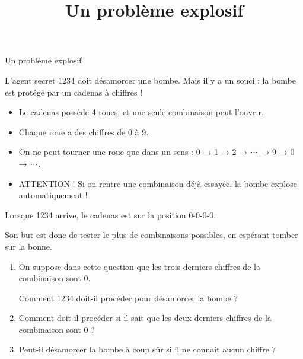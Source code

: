 \documentclass[a4paper,11pt]{article}
\title{Un problème explosif}
\date{}
\author{}
\begin{document}
\begin{center}
	\LARGE

	Un problème explosif
\end{center}


\vspace{1em}

L'agent secret 1234 doit désamorcer une bombe. Mais il y a un souci : la bombe est protégé par un cadenas à chiffres !

\begin{itemize}
	\item Le cadenas possède 4 roues, et une seule combinaison peut l'ouvrir.
	\item Chaque roue a des chiffres de 0 à 9.
	\item On ne peut tourner une roue que dans un sens : 0 → 1 → 2 → ⋯ → 9 → 0 → ⋯.
	\item ATTENTION ! Si on rentre une combinaison déjà essayée, la bombe explose automatiquement !
\end{itemize}

Lorsque 1234 arrive, le cadenas est sur la position 0-0-0-0.

Son but est donc de tester le plus de combinaisons possibles, en espérant tomber sur la bonne.

\begin{enumerate}
	\item On suppose dans cette question que les trois derniers chiffres de la combinaison sont 0.

	      Comment 1234 doit-il procéder pour désamorcer la bombe ?
	\item Comment doit-il procéder si il sait que les deux derniers chiffres de la combinaison sont 0 ?
	\item Peut-il désamorcer la bombe à coup sûr si il ne connait aucun chiffre ?
\end{enumerate}
\end{document}
